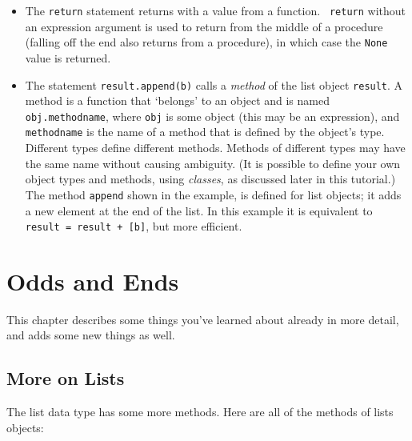 \begin{itemize}

\item
The {\tt return} statement returns with a value from a function.  {\tt
return} without an expression argument is used to return from the middle
of a procedure (falling off the end also returns from a procedure), in
which case the {\tt None} value is returned.

\item
The statement {\tt result.append(b)} calls a {\em method} of the list
object {\tt result}.  A method is a function that `belongs' to an
object and is named {\tt obj.methodname}, where {\tt obj} is some
object (this may be an expression), and {\tt methodname} is the name
of a method that is defined by the object's type.  Different types
define different methods.  Methods of different types may have the
same name without causing ambiguity.  (It is possible to define your
own object types and methods, using {\em classes}, as discussed later
in this tutorial.)
The method {\tt append} shown in the example, is defined for
list objects; it adds a new element at the end of the list.  In this
example
it is equivalent to {\tt result = result + [b]}, but more efficient.

\end{itemize}


\chapter{Odds and Ends}

This chapter describes some things you've learned about already in
more detail, and adds some new things as well.

\section{More on Lists}

The list data type has some more methods.  Here are all of the methods
of lists objects:


